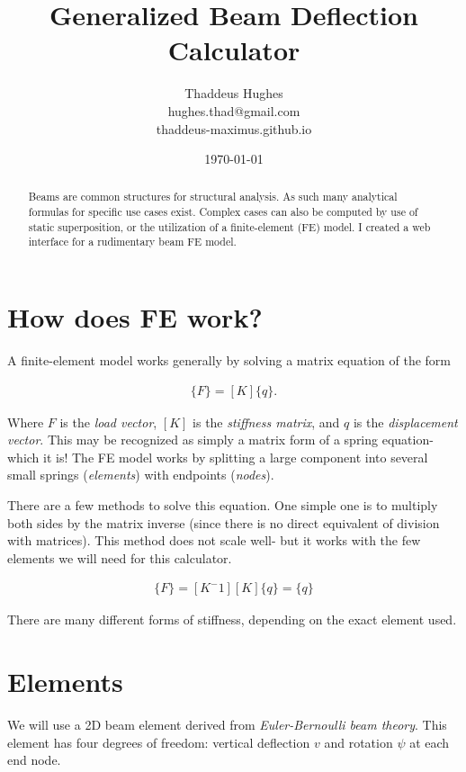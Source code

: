 \documentclass[10pt,letterpaper]{article}
\author{Thaddeus Hughes \\ hughes.thad@gmail.com \\ thaddeus-maximus.github.io}
\date{\today}
\title{Generalized Beam Deflection Calculator}
\begin{document}
	\maketitle
	
	\begin{abstract}
		Beams are common structures for structural analysis. As such many analytical formulas for specific use cases exist. Complex cases can also be computed by use of static superposition, or the utilization of a finite-element (FE) model. I created a web interface for a rudimentary beam FE model.
	\end{abstract}

	\section{How does FE work?}

	A finite-element model works generally by solving a matrix equation of the form

	\begin{align}
		\{F\} = [K]\{q\} .
	\end{align}

	Where ${F}$ is the \textit{load vector}, $[K]$ is the \textit{stiffness matrix}, and ${q}$ is the \textit{displacement vector}. This may be recognized as simply a matrix form of a spring equation- which it is! The FE model works by splitting a large component into several small springs (\textit{elements}) with endpoints (\textit{nodes}).

	There are a few methods to solve this equation. One simple one is to multiply both sides by the matrix inverse (since there is no direct equivalent of division with matrices). This method does not scale well- but it works with the few elements we will need for this calculator.

	\begin{align}
		[K^-1] \{F\} = [K^-1][K]\{q\} = \{q\}
	\end{align}

	There are many different forms of stiffness, depending on the exact element used.

	\section{Elements}

	We will use a 2D beam element derived from \textit{Euler-Bernoulli beam theory}. This element has four degrees of freedom: vertical deflection $v$ and rotation $\psi$ at each end node.
\end{document}
